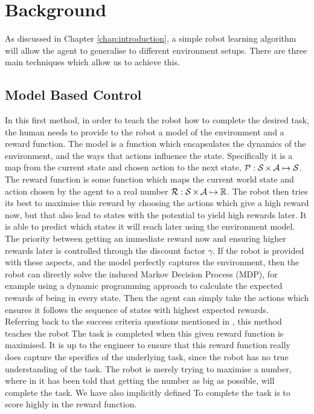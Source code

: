 \chapter{Background}
\label{chap:background}

As discussed in Chapter \ref{chap:introduction}, a simple robot learning algorithm will allow the agent to generalise to different environment setups.
There are three main techniques which allow us to achieve this.

\section{Model Based Control}
\label{sec:model-based-control}
In this first method, in order to teach the robot how to complete the desired task, the human needs to provide to the robot a model of the environment and a reward function. The model is a function which encapsulates the dynamics of the environment, and the ways that actions influence the state. Specifically it is a map from the current state and chosen action to the next state, $\mathcal{P} : \operatorname{\mathcal{S}} \times \operatorname{\mathcal{A}} \mapsto \operatorname{\mathcal{S}}$. The reward function is some function which maps the current world state and action chosen by the agent to a real number $\operatorname{\mathcal{R}} : \operatorname{\mathcal{S}} \times \operatorname{\mathcal{A}} \mapsto \operatorname{\mathbb{R}}$. The robot then tries its best to maximise this reward by choosing the actions which give a high reward now, but that also lead to states with the potential to yield high rewards later. It is able to predict which states it will reach later using the environment model. The priority between getting an immediate reward now and ensuring higher rewards later is controlled through the discount factor $\gamma$. If the robot is provided with these aspects, and the model perfectly captures the environment, then the robot can directly solve the induced Markov Decision Process (MDP), for example using a dynamic programming approach to calculate the expected rewards of being in every state. Then the agent can simply take the actions which ensures it follows the sequence of states with highest expected rewards.\cite{model-based-rl}\\

Referring back to the success criteria questions mentioned in , this method teaches the robot  The task is completed when this given reward function is maximised. It is up to the engineer to ensure that this reward function really does capture the specifics of the underlying task, since the robot has no true understanding of the task. The robot is merely trying to maximise a number, where in it has been told that getting the number as big as possible, will complete the task. We have also implicitly defined  To complete the task is to score highly in the reward function.


